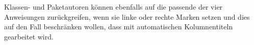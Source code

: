   Klassen- und Paketautoren können ebenfalls auf die passende der vier
  Anweisungen zurückgreifen, wenn sie linke oder rechte Marken setzen und
  dies auf den Fall beschränken wollen, dass mit automatischen Kolumnentiteln
  gearbeitet wird.%
  \EndIndexGroup \fi

%
\EndIndexGroup


